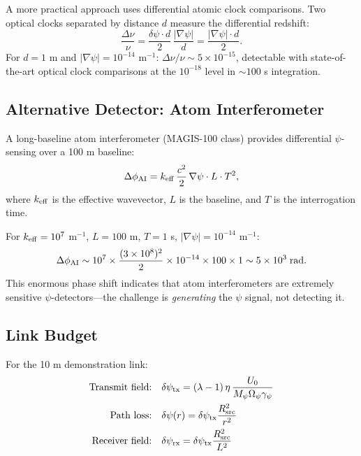\documentclass[twocolumn,superscriptaddress,prd,nofootinbib]{revtex4-2}
\begin{document}
A more practical approach uses differential atomic clock comparisons.
Two optical clocks separated by distance $d$ measure the differential
redshift:
\begin{equation}
\frac{\Delta\nu}{\nu} = \frac{\delta\psi \cdot d}{2}\,\frac{|\nabla\psi|}{d}
= \frac{|\nabla\psi| \cdot d}{2}.
\label{eq:clock-gradient}
\end{equation}
For $d = 1$ m and $|\nabla\psi| = 10^{-14}$ m$^{-1}$:
$\Delta\nu/\nu \sim 5 \times 10^{-15}$, detectable with state-of-the-art
optical clock comparisons at the $10^{-18}$ level in $\sim 100$ s
integration.

\subsection{Alternative Detector: Atom Interferometer}

A long-baseline atom interferometer (MAGIS-100 class) provides
differential $\psi$-sensing over a 100 m baseline:
\begin{equation}
\Delta\phi_{\rm AI} = k_{\rm eff}\,\frac{c^2}{2}\,
\nabla\psi \cdot L \cdot T^2,
\label{eq:AI-sensitivity}
\end{equation}
where $k_{\rm eff}$ is the effective wavevector, $L$ is the baseline,
and $T$ is the interrogation time.

For $k_{\rm eff} = 10^7$ m$^{-1}$, $L = 100$ m, $T = 1$ s,
$|\nabla\psi| = 10^{-14}$ m$^{-1}$:
\begin{equation}
\Delta\phi_{\rm AI} \sim 10^7 \times \frac{(3\times 10^8)^2}{2} \times
10^{-14} \times 100 \times 1 \sim 5 \times 10^{3}\;\text{rad}.
\label{eq:AI-value}
\end{equation}
This enormous phase shift indicates that atom interferometers are
extremely sensitive $\psi$-detectors---the challenge is
\emph{generating} the $\psi$ signal, not detecting it.

\subsection{Link Budget}

For the 10 m demonstration link:
\begin{align}
\text{Transmit field:} &\quad \delta\psi_{\rm tx} = (\lambda - 1)\,\eta\,\frac{U_0}{M_\psi \Omega_\psi \gamma_\psi} \notag \\
\text{Path loss:} &\quad \delta\psi(r) = \delta\psi_{\rm tx}\frac{R_{\rm src}^2}{r^2} \label{eq:path-loss} \\
\text{Receiver field:} &\quad \delta\psi_{\rm rx} = \delta\psi_{\rm tx}\frac{R_{\rm src}^2}{L^2} \notag
\end{align}
\end{document}
